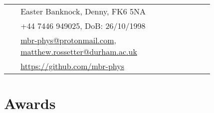 \documentclass[10pt]{article} %
\begin{document}
\begin{paracol}{2}
\parbox[top][0.12\textheight][c]{\linewidth}{ %
	\vspace{-0.04\textheight} %
	\colorbox{shade}{ %
		\begin{supertabular}{p{0.05\linewidth}|p{0.775\linewidth}} %
			\raisebox{-1pt}{\faHome} & Easter Banknock, Denny, FK6 5NA \\ %
			\raisebox{-1pt}{\faPhone} & +44 7446 949025, DoB: 26/10/1998 \\ %
            \raisebox{0pt}{\small\faEnvelope} & \href{mailto:mbr-phys@protonmail.com}{mbr-phys@protonmail.com}, \href{mailto:matthew.rossetter@durham.ac.uk}{matthew.rossetter@durham.ac.uk} \\ %
			\raisebox{-1pt}{\faGithub} & \href{https://github.com/mbr-phys}{https://github.com/mbr-phys} \\ %
		\end{supertabular}
	}
}


\section{Awards}






\end{paracol}
\end{document}

